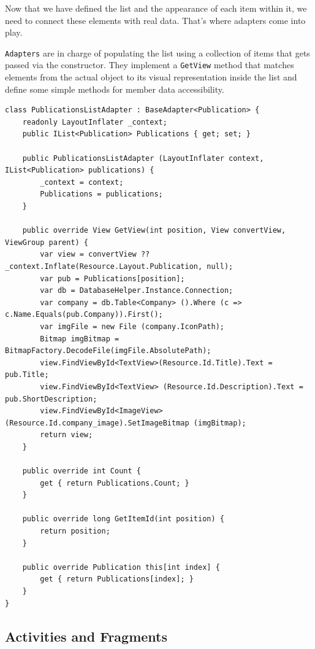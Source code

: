 Now that we have defined the list and the appearance of each item within it, we need to connect these elements with real data. That's where adapters come into play. 

\texttt{Adapters} are in charge of populating the list using a collection of items that gets passed via the constructor. They implement a \texttt{GetView} method that matches elements from the actual object to its visual representation inside the list and define some simple methods for member data accessibility.

\lstset{language=[Sharp]C}

\begin{lstlisting}[frame=lt,caption=PublicationsListAdapter.cs, label={list:pubList_cs}]
class PublicationsListAdapter : BaseAdapter<Publication> {
	readonly LayoutInflater _context; 
	public IList<Publication> Publications { get; set; }

	public PublicationsListAdapter (LayoutInflater context, IList<Publication> publications) {
		_context = context;
		Publications = publications;		
	}

	public override View GetView(int position, View convertView, ViewGroup parent) {
		var view = convertView ?? _context.Inflate(Resource.Layout.Publication, null);
		var pub = Publications[position];
		var db = DatabaseHelper.Instance.Connection;
		var company = db.Table<Company> ().Where (c => c.Name.Equals(pub.Company)).First();
		var imgFile = new File (company.IconPath);
		Bitmap imgBitmap = BitmapFactory.DecodeFile(imgFile.AbsolutePath);
		view.FindViewById<TextView>(Resource.Id.Title).Text = pub.Title; 
		view.FindViewById<TextView> (Resource.Id.Description).Text = pub.ShortDescription;
		view.FindViewById<ImageView> (Resource.Id.company_image).SetImageBitmap (imgBitmap);
		return view; 
	}

	public override int Count {
		get { return Publications.Count; } 
	}

	public override long GetItemId(int position) {
		return position; 
	}

	public override Publication this[int index] {
		get { return Publications[index]; } 
	}
}
\end{lstlisting}



\subsection{Activities and Fragments}




